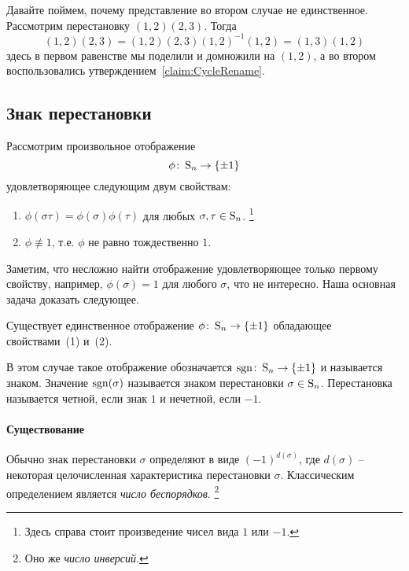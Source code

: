 Давайте поймем, почему представление во втором случае не единственное.
Рассмотрим перестановку $(1,2)(2,3)$.
Тогда
\[
(1,2)(2,3) = (1,2)(2,3)(1,2)^{-1}(1,2) = (1,3)(1,2)
\]
здесь в первом равенстве мы поделили и домножили на $(1,2)$, а во втором воспользовались утверждением~\ref{claim:CycleRename}.

\subsection{Знак перестановки}

Рассмотрим произвольное отображение 
\[
\phi\colon \operatorname{S}_{n}\to \{\pm 1\}
\]
удовлетворяющее следующим двум свойствам:
\begin{enumerate}
\item $\phi(\sigma \tau) = \phi(\sigma)\phi(\tau)$ для любых $\sigma, \tau \in\operatorname{S}_{n}$.%
\footnote{Здесь справа стоит произведение чисел вида $1$ или $-1$.}

\item $\phi\not\equiv 1$, т.е. $\phi$ не равно тождественно $1$.
\end{enumerate}
Заметим, что несложно найти отображение удовлетворяющее только первому свойству, например, $\phi(\sigma) = 1$ для любого $\sigma$, что не интересно.
Наша основная задача доказать следующее.

\begin{claim}
Существует единственное отображение $\phi\colon \operatorname{S}_{n} \to \{\pm 1\}$ обладающее свойствами~(1) и~(2).
\end{claim}

В этом случае такое отображение обозначается $\operatorname{sgn}\colon \operatorname{S}_{n}\to \{\pm1\}$ и называется знаком.
Значение $\operatorname{sgn}(\sigma)$ называется знаком перестановки $\sigma\in\operatorname{S}_{n}$.
Перестановка называется четной, если знак $1$ и нечетной, если $-1$.

\paragraph{Существование}

Обычно знак перестановки $\sigma$ определяют в виде $(-1)^{d(\sigma)}$, где $d(\sigma)$ -- некоторая целочисленная характеристика перестановки $\sigma$.
Классическим определением является {\it число беспорядков}.%
\footnote{Оно же {\it число инверсий}.} 

